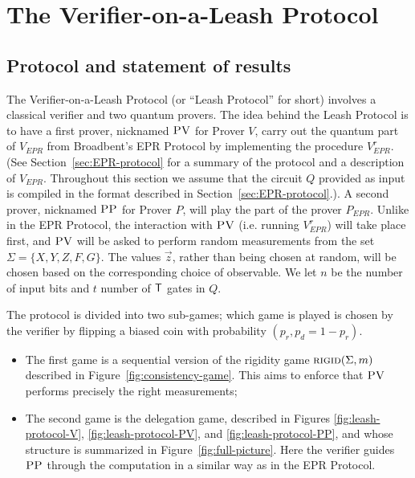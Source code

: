 \documentclass[11pt]{article}
\newcommand{\rigid}{\textsc{rigid}}
\newcommand{\pv}{\textsc{PV}}
\newcommand{\pp}{\textsc{PP}}
\begin{document}



\section{The Verifier-on-a-Leash Protocol}
\label{sec:leash}




\subsection{Protocol and statement of results}

The Verifier-on-a-Leash Protocol (or ``Leash Protocol'' for short) involves a classical verifier and two quantum provers.
The idea behind the Leash Protocol is to have a first prover, nicknamed $\pv$ for Prover $V$, carry out the quantum part of $V_{EPR}$ from Broadbent's EPR Protocol by implementing the procedure $V_{EPR}^r$. (See Section~\ref{sec:EPR-protocol} for a summary of the protocol and a description of $V_{EPR}$. Throughout this section we assume that the circuit $Q$ provided as input is compiled in the format described in Section~\ref{sec:EPR-protocol}.). A second prover, nicknamed $\pp$ for Prover $P$, will play the part of the prover $P_{EPR}$. Unlike in the EPR Protocol, the interaction with $\pv$ (i.e. running $V_{EPR}^r$) will take place {first}, and $\pv$ will be asked to perform {random} measurements from the set $\Sigma = \{X,Y,Z,F,G\}$. The values $\vec{z}$, rather than being chosen at random, will be chosen based on the corresponding choice of observable. We let $n$ be the number of input bits and $t$ number of $\sf T$ gates in $Q$. 

The protocol is divided into two sub-games; which game is played is chosen by the verifier by flipping a biased coin with probability $(p_r,p_d=1-p_r)$.
\begin{itemize}[nolistsep]
\item The first game is a sequential version of the rigidity game $\rigid(\Sigma,m)$ described in Figure~\ref{fig:consistency-game}. This aims to enforce that $\pv$ performs precisely the right measurements;

\item The second game is the delegation game, described in Figures \ref{fig:leash-protocol-V}, \ref{fig:leash-protocol-PV}, and \ref{fig:leash-protocol-PP}, and whose structure is summarized in Figure~\ref{fig:full-picture}. Here the verifier guides $\pp$ through the computation in a similar way as in the EPR Protocol.
\end{itemize}
\end{document}
